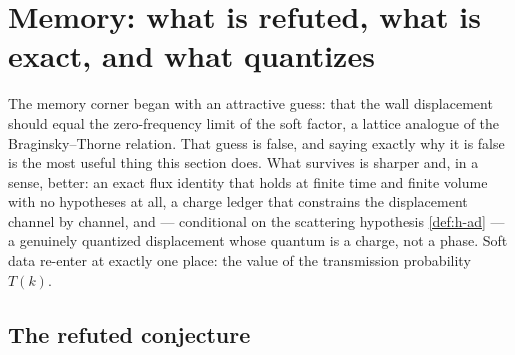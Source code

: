 
\newcommand{\shiftop}{\mathsf{T}}

\section{Memory: what is refuted, what is exact, and what quantizes}
\label{sec:memory-quantization}

The memory corner began with an attractive guess: that the wall displacement
should equal the zero-frequency limit of the soft factor, a lattice analogue of
the Braginsky--Thorne relation. That guess is false, and saying exactly why it
is false is the most useful thing this section does. What survives is sharper
and, in a sense, better: an exact flux identity that holds at finite time and
finite volume with no hypotheses at all, a charge ledger that constrains the
displacement channel by channel, and --- conditional on the scattering
hypothesis \cref{def:h-ad} --- a genuinely quantized displacement whose quantum
is a charge, not a phase. Soft data re-enter at exactly one place: the value of
the transmission probability $T(k)$.

\subsection{The refuted conjecture}

